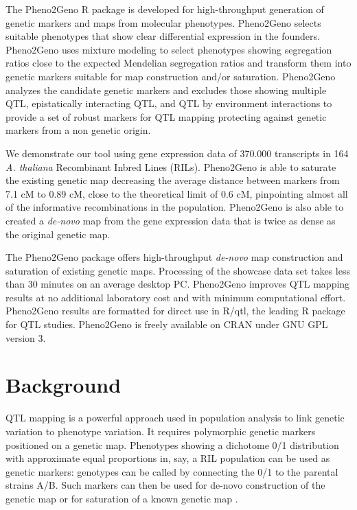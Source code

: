 The Pheno2Geno R package is developed for high-throughput generation of genetic markers and maps from 
molecular phenotypes. Pheno2Geno selects suitable phenotypes that show clear differential expression 
in the founders. Pheno2Geno uses mixture modeling to select phenotypes showing segregation ratios 
close to the expected Mendelian segregation ratios and transform them into genetic markers suitable 
for map construction and/or saturation. Pheno2Geno analyzes the candidate genetic markers and excludes 
those showing multiple QTL, epistatically interacting QTL, and QTL by environment interactions to 
provide a set of robust markers for QTL mapping protecting against genetic markers from a non genetic 
origin.

We demonstrate our tool using gene expression data of 370.000 transcripts in 164 \emph{A. thaliana} 
Recombinant Inbred Lines (RILs). Pheno2Geno is able to saturate the existing genetic map decreasing 
the average distance between markers from 7.1 cM to 0.89 cM, close to the theoretical limit of 0.6 cM, 
pinpointing almost all of the informative recombinations in the population. Pheno2Geno is also able 
to created a \emph{de-novo} map from the gene expression data that is twice as dense as the original 
genetic map.

The Pheno2Geno package offers high-throughput \emph{de-novo} map construction and saturation of 
existing genetic maps. Processing of the showcase data set takes less than 30 minutes on an average 
desktop PC. Pheno2Geno improves QTL mapping results at no additional laboratory cost and with 
minimum computational effort. Pheno2Geno results are formatted for direct use in R/qtl, the leading 
R package for QTL studies. Pheno2Geno is freely available on CRAN under GNU GPL version 3.

\section{Background}
QTL mapping \cite{Lander:1989} is a powerful approach used in population analysis to link 
genetic variation to phenotype variation. It requires polymorphic genetic markers positioned 
on a genetic map. Phenotypes showing a dichotome 0/1 distribution with approximate equal 
proportions in, say, a RIL population can be used as genetic markers: genotypes can be 
called by connecting the 0/1 to the parental strains A/B. Such markers can then be used 
for de-novo construction of the genetic map or for saturation of a known genetic map 
\cite{West:2006, Truco:2013}.

